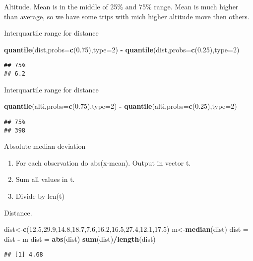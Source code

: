 \documentclass[
]{article}
\newenvironment{Shaded}{\begin{snugshade}}{\end{snugshade}}
\newcommand{\DataTypeTok}[1]{\textcolor[rgb]{0.13,0.29,0.53}{#1}}
\newcommand{\DecValTok}[1]{\textcolor[rgb]{0.00,0.00,0.81}{#1}}
\newcommand{\FloatTok}[1]{\textcolor[rgb]{0.00,0.00,0.81}{#1}}
\newcommand{\KeywordTok}[1]{\textcolor[rgb]{0.13,0.29,0.53}{\textbf{#1}}}
\newcommand{\NormalTok}[1]{#1}
\newcommand{\OperatorTok}[1]{\textcolor[rgb]{0.81,0.36,0.00}{\textbf{#1}}}
\newcommand{\StringTok}[1]{\textcolor[rgb]{0.31,0.60,0.02}{#1}}
\providecommand{\tightlist}{%
  \setlength{\itemsep}{0pt}\setlength{\parskip}{0pt}}
\begin{document}
Altitude. Mean is in the middle of 25\% and 75\% range. Mean is much
higher than average, so we have some trips with mich higher altitude
move then others.

Interquartile range for distance

\begin{Shaded}
\begin{Highlighting}[]
  \KeywordTok{quantile}\NormalTok{(dist,}\DataTypeTok{probs=}\KeywordTok{c}\NormalTok{(}\FloatTok{0.75}\NormalTok{),}\DataTypeTok{type=}\DecValTok{2}\NormalTok{) }\OperatorTok{-}\StringTok{ }\KeywordTok{quantile}\NormalTok{(dist,}\DataTypeTok{probs=}\KeywordTok{c}\NormalTok{(}\FloatTok{0.25}\NormalTok{),}\DataTypeTok{type=}\DecValTok{2}\NormalTok{)}
\end{Highlighting}
\end{Shaded}

\begin{verbatim}
## 75% 
## 6.2
\end{verbatim}

Interquartile range for distance

\begin{Shaded}
\begin{Highlighting}[]
  \KeywordTok{quantile}\NormalTok{(alti,}\DataTypeTok{probs=}\KeywordTok{c}\NormalTok{(}\FloatTok{0.75}\NormalTok{),}\DataTypeTok{type=}\DecValTok{2}\NormalTok{) }\OperatorTok{-}\StringTok{ }\KeywordTok{quantile}\NormalTok{(alti,}\DataTypeTok{probs=}\KeywordTok{c}\NormalTok{(}\FloatTok{0.25}\NormalTok{),}\DataTypeTok{type=}\DecValTok{2}\NormalTok{)}
\end{Highlighting}
\end{Shaded}

\begin{verbatim}
## 75% 
## 398
\end{verbatim}

Absolute median deviation

\begin{enumerate}
\def\labelenumi{\arabic{enumi}.}
\tightlist
\item
  For each observation do abs(x-mean). Output in vector t.
\item
  Sum all values in t.
\item
  Divide by len(t)
\end{enumerate}

Distance.

\begin{Shaded}
\begin{Highlighting}[]
\NormalTok{dist<-}\KeywordTok{c}\NormalTok{(}\FloatTok{12.5}\NormalTok{,}\FloatTok{29.9}\NormalTok{,}\FloatTok{14.8}\NormalTok{,}\FloatTok{18.7}\NormalTok{,}\FloatTok{7.6}\NormalTok{,}\FloatTok{16.2}\NormalTok{,}\FloatTok{16.5}\NormalTok{,}\FloatTok{27.4}\NormalTok{,}\FloatTok{12.1}\NormalTok{,}\FloatTok{17.5}\NormalTok{)}
\NormalTok{m<-}\KeywordTok{median}\NormalTok{(dist)}
\NormalTok{dist =}\StringTok{ }\NormalTok{dist }\OperatorTok{-}\StringTok{ }\NormalTok{m}
\NormalTok{dist =}\StringTok{ }\KeywordTok{abs}\NormalTok{(dist)}
\KeywordTok{sum}\NormalTok{(dist)}\OperatorTok{/}\KeywordTok{length}\NormalTok{(dist)}
\end{Highlighting}
\end{Shaded}

\begin{verbatim}
## [1] 4.68
\end{verbatim}
\end{document}
